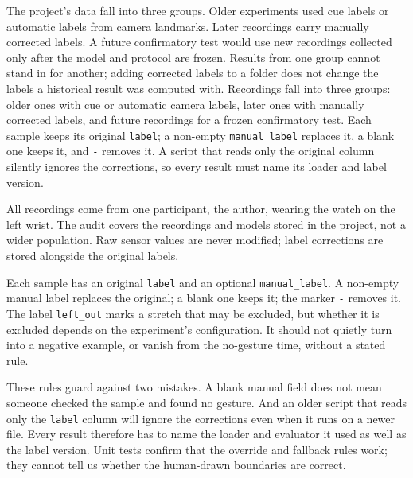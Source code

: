 
\label{reference-annotations-and-source-audit}

\iffull
{}\label{evidence-cohorts}
\fi

\iffull
The project's data fall into three groups. Older experiments used cue labels or automatic labels from camera landmarks. Later recordings carry manually corrected labels. A future confirmatory test would use new recordings collected only after the model and protocol are frozen. Results from one group cannot stand in for another; adding corrected labels to a folder does not change the labels a historical result was computed with.
\else
Recordings fall into three groups: older ones with cue or automatic camera labels, later ones with manually corrected labels, and future recordings for a frozen confirmatory test. Each sample keeps its original \nolinkurl{label}; a non-empty \nolinkurl{manual_label} replaces it, a blank one keeps it, and \nolinkurl{-} removes it. A script that reads only the original column silently ignores the corrections, so every result must name its loader and label version.
\fi

\iffull
All recordings come from one participant, the author, wearing the watch on the left wrist. The audit covers the recordings and models stored in the project, not a wider population. Raw sensor values are never modified; label corrections are stored alongside the original labels.
\fi

\iffull
{}\label{effective-label-semantics}
\fi

\iffull
Each sample has an original \nolinkurl{label} and an optional \nolinkurl{manual_label}. A non-empty manual label replaces the original; a blank one keeps it; the marker \nolinkurl{-} removes it. The label \nolinkurl{left_out} marks a stretch that may be excluded, but whether it is excluded depends on the experiment's configuration. It should not quietly turn into a negative example, or vanish from the no-gesture time, without a stated rule.
\fi

\iffull
These rules guard against two mistakes. A blank manual field does not mean someone checked the sample and found no gesture. And an older script that reads only the \nolinkurl{label} column will ignore the corrections even when it runs on a newer file. Every result therefore has to name the loader and evaluator it used as well as the label version. Unit tests confirm that the override and fallback rules work; they cannot tell us whether the human-drawn boundaries are correct.
\fi

